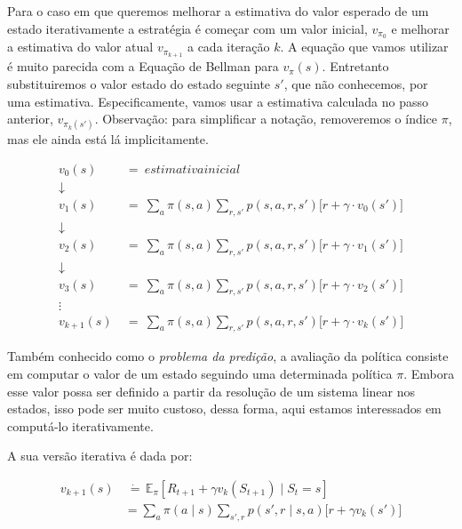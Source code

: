 \documentclass{article}
\begin{document}
            Para o caso em que queremos melhorar a estimativa do valor esperado de um estado iterativamente a estratégia é começar com um valor inicial, $v_{\pi_{0}}$ e melhorar a estimativa do valor atual $v_{\pi_{k+1}}$ a cada iteração $k$.
            A equação que vamos utilizar é muito parecida com a Equação de Bellman para $v_{\pi}(s)$. 
            Entretanto substituiremos o valor estado do estado seguinte $s'$, que não conhecemos, por uma estimativa.
            Especificamente, vamos usar a estimativa calculada no passo anterior, $v_{\pi_{k}(s')}$.
            Observação: para simplificar a notação, removeremos o índice $\pi$, mas ele ainda está lá implicitamente.
            
            \begin{equation}
            \begin{split}
                v_0(s) & \ = \ estimativa inicial\\
                \downarrow\\
                v_1(s) & \ = \ \sum_{a} \pi(s, a) \sum_{r, s'} p(s, a, r, s') \Big[ r + \gamma \cdot v_0(s') \Big]\\
                \downarrow\\
                v_2(s) & \ = \ \sum_{a} \pi(s, a) \sum_{r, s'} p(s, a, r, s') \Big[ r + \gamma \cdot v_1(s') \Big]\\
                \downarrow\\
                v_3(s) & \ = \ \sum_{a} \pi(s, a) \sum_{r, s'} p(s, a, r, s') \Big[ r + \gamma \cdot v_2(s') \Big]\\
                \vdots\\
                v_{k+1}(s) & \ = \ \sum_{a} \pi(s, a) \sum_{r, s'} p(s, a, r, s') \Big[ r + \gamma \cdot v_k(s') \Big]
            \end{split}
            \end{equation}
    
            Também conhecido como o \textit{problema da predição}, a avaliação da política consiste em computar o valor de um estado seguindo uma determinada política $\pi$. Embora esse valor possa ser definido a partir da resolução de um sistema linear nos estados, isso pode ser muito custoso, dessa forma, aqui estamos interessados em computá-lo iterativamente.
                    
            A sua versão iterativa é dada por:
            
            \begin{equation}
                \begin{split}
                    v_{k+1}(s) & \ \dot{=} \, \mathbb{E}_{\pi} \left[ R_{t+1} + \gamma v_k(S_{t+1}) \mid S_t = s \right] \\
                    & = \sum_a \pi(a \mid s) \sum_{s',r} p(s',r \mid s,a) \Big[ r + \gamma v_k(s') \Big]
                \end{split}
            \end{equation}
            
\end{document}

